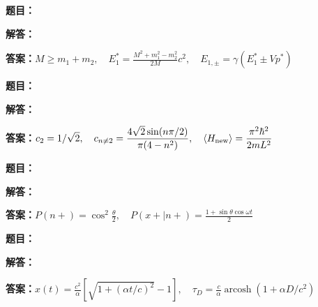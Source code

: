 \documentclass[lang=cn,color=blue,11pt]{elegantbook}
\begin{document}
\par
\noindent\textbf{题目：}
\par\noindent\textbf{解答：}
\par\noindent\textbf{答案：}\(\displaystyle M\ge m_1+m_2,\quad E_1^*=\frac{M^2+m_1^2-m_2^2}{2M}c^2,\quad E_{1,\pm}=\gamma(E_1^*\pm Vp^*)\)\par
\par\smallskip\noindent\hrulefill\par\medskip
{}\par
\noindent\textbf{题目：}
\par\noindent\textbf{解答：}
\par\noindent\textbf{答案：}\(\displaystyle c_2=1/\sqrt2,\quad c_{n\ne2}=\frac{4\sqrt2\sin(n\pi/2)}{\pi(4-n^2)},\quad \langle H_{\rm new}\rangle=\frac{\pi^2\hbar^2}{2mL^2}\)\par
\par\smallskip\noindent\hrulefill\par\medskip
{}\par
\noindent\textbf{题目：}
\par\noindent\textbf{解答：}
\par\noindent\textbf{答案：}\(\displaystyle P(n+)=\cos^2\frac\theta2,\quad P(x+|n+)=\frac{1+\sin\theta\cos\omega t}{2}\)\par
\par\smallskip\noindent\hrulefill\par\medskip
{}\par
\noindent\textbf{题目：}
\par\noindent\textbf{解答：}
\par\noindent\textbf{答案：}\(\displaystyle x(t)=\frac{c^2}{\alpha}[\sqrt{1+(\alpha t/c)^2}-1],\quad \tau_D=\frac c\alpha\operatorname{arcosh}(1+\alpha D/c^2)\)\par
\par\smallskip\noindent\hrulefill\par\medskip
\end{document}
